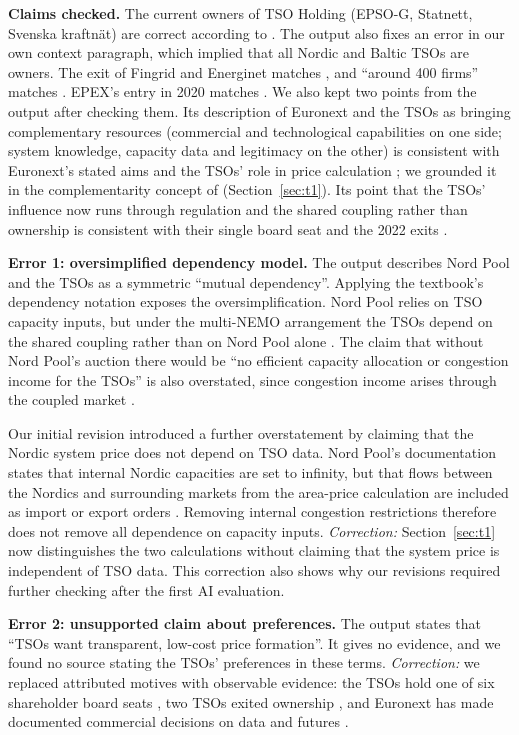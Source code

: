 \textbf{Claims checked.} The current owners of TSO Holding
(EPSO-G, Statnett, Svenska kraftnät) are correct according to
\citet{NPAbout}. The output also fixes an error in our own
context paragraph, which implied that all Nordic and Baltic
TSOs are owners. The exit of Fingrid and Energinet matches
\citet{EPSOG2022Completed}, and ``around 400 firms'' matches
\citet{NP2024}. EPEX's entry in 2020 matches \citet{EPEX2020}.
We also kept two points from the output after checking them.
Its description of Euronext and the TSOs as bringing
complementary resources (commercial and technological
capabilities on one side; system knowledge, capacity data
and legitimacy on the other) is consistent with Euronext's
stated aims \citep{Euronext2020} and the TSOs' role in
price calculation \citep{NPPrice}; we grounded it in the
complementarity concept of \citet{Jacobides2018}
(Section~\ref{sec:t1}). Its point that the TSOs' influence
now runs through regulation and the shared coupling rather
than ownership is consistent with their single board seat
\citep{NPBoard} and the 2022 exits \citep{EPSOG2022Completed}.

\textbf{Error 1: oversimplified dependency model.}
The output describes Nord Pool and the TSOs as a symmetric
``mutual dependency''. Applying the textbook's dependency
notation \citep[Figure~4.3]{OverbyAudestad2021} exposes
the oversimplification. Nord Pool relies on TSO capacity inputs,
but under the multi-NEMO arrangement the TSOs depend on the
shared coupling rather than on Nord Pool alone
\citep{EPEX2020}. The claim that without Nord Pool's auction
there would be ``no efficient capacity allocation or congestion
income for the TSOs'' is also overstated,
since congestion income arises through the coupled market
\citep[Article~68]{CACM2015}.

Our initial revision introduced a further overstatement
by claiming that the Nordic system price does not depend
on TSO data. Nord Pool's documentation states that internal
Nordic capacities are set to infinity, but that flows between
the Nordics and surrounding markets from the area-price
calculation are included as import or export orders
\citep{NPPrice}. Removing internal congestion restrictions
therefore does not remove all dependence on capacity inputs.
\emph{Correction:} Section~\ref{sec:t1}
now distinguishes the two calculations without claiming
that the system price is independent of TSO data.
This correction also shows why our revisions required
further checking after the first AI evaluation.

\textbf{Error 2: unsupported claim about preferences.}
The output states that ``TSOs want transparent, low-cost
price formation''. It gives no evidence, and we found no
source stating the TSOs' preferences in these terms.
\emph{Correction:} we replaced attributed motives with
observable evidence: the TSOs hold one of six shareholder board seats
\citep{NPBoard}, two TSOs exited ownership
\citep{EPSOG2022Completed}, and Euronext has made documented
commercial decisions on data and futures
\citep{ERR2022,Euronext2026}.

